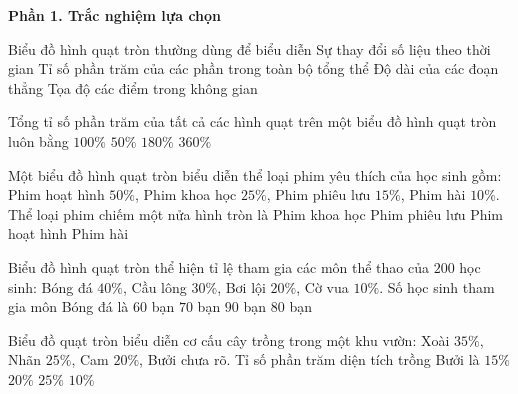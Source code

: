 \textbf{Phần 1. Trắc nghiệm lựa chọn}

\begin{ex} %
Biểu đồ hình quạt tròn thường dùng để biểu diễn
\choice
{Sự thay đổi số liệu theo thời gian}
{\True Tỉ số phần trăm của các phần trong toàn bộ tổng thể}
{Độ dài của các đoạn thẳng}
{Tọa độ các điểm trong không gian}
\end{ex}

\begin{ex} %
Tổng tỉ số phần trăm của tất cả các hình quạt trên một biểu đồ hình quạt tròn luôn bằng
\choice
{\True $100\%$}
{$50\%$}
{$180\%$}
{$360\%$}
\end{ex}

\begin{ex} %
Một biểu đồ hình quạt tròn biểu diễn thể loại phim yêu thích của học sinh gồm: Phim hoạt hình $50\%$, Phim khoa học $25\%$, Phim phiêu lưu $15\%$, Phim hài $10\%$. Thể loại phim chiếm một nửa hình tròn là
\choice
{Phim khoa học}
{Phim phiêu lưu}
{\True Phim hoạt hình}
{Phim hài}
\end{ex}

\begin{ex} %
Biểu đồ hình quạt tròn thể hiện tỉ lệ tham gia các môn thể thao của $200$ học sinh: Bóng đá $40\%$, Cầu lông $30\%$, Bơi lội $20\%$, Cờ vua $10\%$. Số học sinh tham gia môn Bóng đá là
\choice
{$60$ bạn}
{$70$ bạn}
{$90$ bạn}
{\True $80$ bạn}
\end{ex}

\begin{ex} %
Biểu đồ quạt tròn biểu diễn cơ cấu cây trồng trong một khu vườn: Xoài $35\%$, Nhãn $25\%$, Cam $20\%$, Bưởi chưa rõ. Tỉ số phần trăm diện tích trồng Bưởi là
\choice
{$15\%$}
{\True $20\%$}
{$25\%$}
{$10\%$}
\end{ex}

